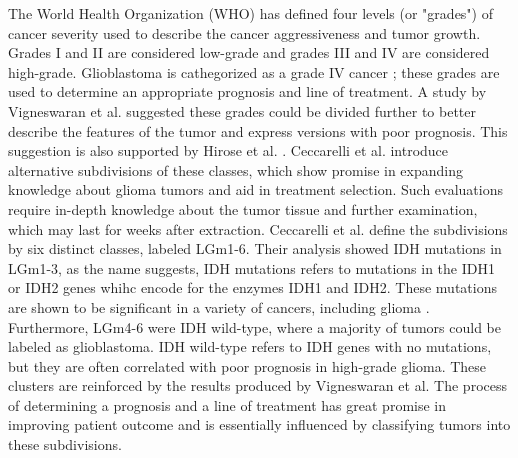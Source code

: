 The World Health Organization (WHO) has defined four levels (or "grades") of cancer severity used to describe the cancer aggressiveness and tumor growth. Grades I and II are considered low-grade and grades III and IV are considered high-grade. Glioblastoma is cathegorized as a grade IV cancer \cite{bleeker2012recent, gradesandpriorsubdivision}; these grades are used to determine an appropriate prognosis and line of treatment. A study by Vigneswaran et al. \cite{gradesandpriorsubdivision} suggested these grades could be divided further to better describe the features of the tumor and express versions with poor prognosis. This suggestion is also supported by Hirose et al. \cite{hirose2013subgrouping}. Ceccarelli et al. \cite{cellsubsets} introduce alternative subdivisions of these classes, which show promise in expanding knowledge about glioma tumors and aid in treatment selection. Such evaluations require in-depth knowledge about the tumor tissue and further examination, which may last for weeks after extraction. Ceccarelli et al. define the subdivisions by six distinct classes, labeled LGm1-6. Their analysis showed IDH mutations in LGm1-3, as the name suggests, IDH mutations refers to mutations in the IDH1 or IDH2 genes whihc encode for the enzymes IDH1 and IDH2. These mutations are shown to be significant in a variety of cancers, including glioma \cite{dang2016idh}. Furthermore, LGm4-6 were IDH wild-type, where a majority of tumors could be labeled as glioblastoma. IDH wild-type refers to IDH genes with no mutations, but they are often correlated with poor prognosis in high-grade glioma. These clusters are reinforced by the results produced by Vigneswaran et al. The process of determining a prognosis and a line of treatment has great promise in improving patient outcome and is essentially influenced by classifying tumors into these subdivisions.

